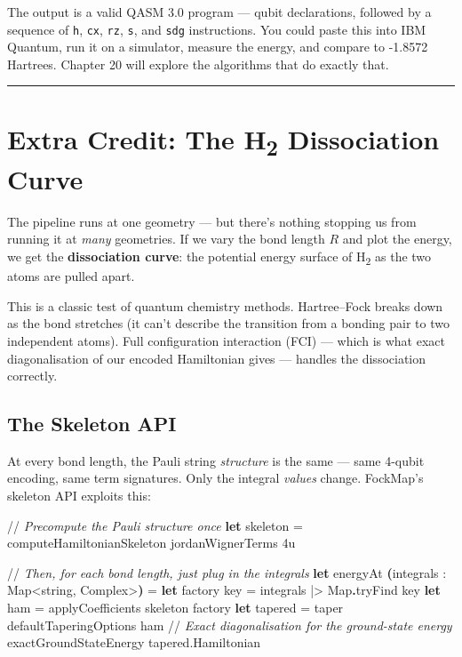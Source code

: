 \documentclass[
  11pt,
  oneside]{book}
\newenvironment{Shaded}{\begin{snugshade}}{\end{snugshade}}
\newcommand{\CommentTok}[1]{\textcolor[rgb]{0.56,0.35,0.01}{\textit{#1}}}
\newcommand{\DataTypeTok}[1]{\textcolor[rgb]{0.13,0.29,0.53}{#1}}
\newcommand{\DecValTok}[1]{\textcolor[rgb]{0.00,0.00,0.81}{#1}}
\newcommand{\KeywordTok}[1]{\textcolor[rgb]{0.13,0.29,0.53}{\textbf{#1}}}
\newcommand{\NormalTok}[1]{#1}
\newcommand{\OperatorTok}[1]{\textcolor[rgb]{0.81,0.36,0.00}{\textbf{#1}}}
\begin{document}
The output is a valid QASM 3.0 program --- qubit declarations, followed
by a sequence of \texttt{h}, \texttt{cx}, \texttt{rz}, \texttt{s}, and
\texttt{sdg} instructions. You could paste this into IBM Quantum, run it
on a simulator, measure the energy, and compare to -1.8572 Hartrees.
Chapter 20 will explore the algorithms that do exactly that.

\begin{center}\rule{0.5\linewidth}{0.5pt}\end{center}

\section{Extra Credit: The H\textsubscript{2} Dissociation
Curve}\label{extra-credit-the-hux2082-dissociation-curve}

The pipeline runs at one geometry --- but there's nothing stopping us
from running it at \emph{many} geometries. If we vary the bond length
\(R\) and plot the energy, we get the \textbf{dissociation curve}: the
potential energy surface of H\textsubscript{2} as the two atoms are pulled apart.

This is a classic test of quantum chemistry methods. Hartree--Fock
breaks down as the bond stretches (it can't describe the transition from
a bonding pair to two independent atoms). Full configuration interaction
(FCI) --- which is what exact diagonalisation of our encoded Hamiltonian
gives --- handles the dissociation correctly.

\subsection{The Skeleton API}\label{the-skeleton-api}

At every bond length, the Pauli string \emph{structure} is the same ---
same 4-qubit encoding, same term signatures. Only the integral
\emph{values} change. FockMap's skeleton API exploits this:

\begin{Shaded}
\begin{Highlighting}[]
\NormalTok{//}\CommentTok{ Precompute the Pauli structure once}
\KeywordTok{let}\NormalTok{ skeleton = computeHamiltonianSkeleton jordanWignerTerms }\DecValTok{4}\NormalTok{u}

\NormalTok{//}\CommentTok{ Then, for each bond length, just plug in the integrals}
\KeywordTok{let}\NormalTok{ energyAt }\OperatorTok{(}\NormalTok{integrals : Map\textless{}}\DataTypeTok{string}\NormalTok{, Complex\textgreater{}}\OperatorTok{)}\NormalTok{ =}
    \KeywordTok{let}\NormalTok{ factory key = integrals |\textgreater{} Map}\KeywordTok{.}\NormalTok{tryFind key}
    \KeywordTok{let}\NormalTok{ ham = applyCoefficients skeleton factory}
    \KeywordTok{let}\NormalTok{ tapered = taper defaultTaperingOptions ham}
\NormalTok{    //}\CommentTok{ Exact diagonalisation for the ground{-}state energy}
\NormalTok{    exactGroundStateEnergy tapered.Hamiltonian}
\end{Highlighting}
\end{Shaded}
\end{document}
